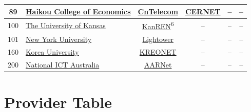 \begin{small}
\begin{center}
\begin{longtable}{|c|c|c|c|c|c|}
 89 & \multicolumn{1}{|l|}{\index{Haikou College of Economics}\index{Site!Haikou College of Economics}\hyperref[sec:HKC]{Haikou College of Economics}} & \href{http://www.chinatelecom.com.cn}{CnTelecom} & \href{http://www.cernet.edu.cn}{CERNET} & – & – \\ \hline
 100 & \multicolumn{1}{|l|}{\index{The University of Kansas}\index{Site!The University of Kansas}\hyperref[sec:KU]{The University of Kansas}} & \href{http://www.kanren.net}{KanREN}\textsuperscript{6} & – & – & – \\ \hline
 101 & \multicolumn{1}{|l|}{\index{New York University}\index{Site!New York University}\hyperref[sec:NYU]{New York University}} & \href{http://www.lightower.com}{Lightower} & – & – & – \\ \hline
 160 & \multicolumn{1}{|l|}{\index{Korea University}\index{Site!Korea University}\hyperref[sec:KRU]{Korea University}} & \href{http://www.kreonet.net}{KREONET} & – & – & – \\ \hline
 200 & \multicolumn{1}{|l|}{\index{National ICT Australia}\index{Site!National ICT Australia}\hyperref[sec:NICTA]{National ICT Australia}} & \href{https://www.aarnet.edu.au/}{AARNet} & – & – & – \\ \hline
\end{longtable}
\end{center}
\end{small}




\chapter{Provider Table}
\label{cha:Providers}


